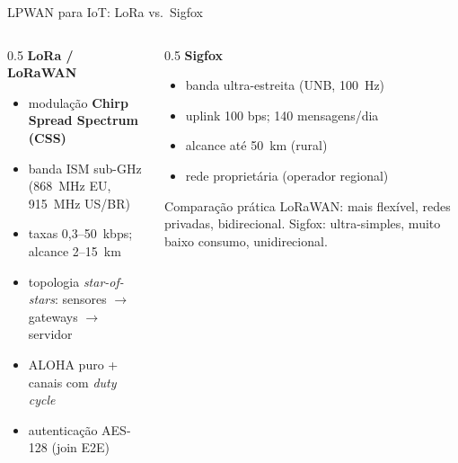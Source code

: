 \documentclass[aspectratio=169,11pt]{beamer}
\begin{document}
\begin{frame}{LPWAN para IoT: LoRa vs.\ Sigfox}
  \begin{columns}
    \begin{column}{0.5\textwidth}
      \textbf{LoRa / LoRaWAN}
      \begin{itemize}
        \item modulação \textbf{Chirp Spread Spectrum (CSS)}
        \item banda ISM sub-GHz (868~MHz EU, 915~MHz US/BR)
        \item taxas 0,3--50~kbps; alcance 2--15~km
        \item topologia \emph{star-of-stars}: sensores $\rightarrow$ gateways $\rightarrow$ servidor
        \item ALOHA puro + canais com \emph{duty cycle}
        \item autenticação AES-128 (join E2E)
      \end{itemize}
    \end{column}
    \begin{column}{0.5\textwidth}
      \textbf{Sigfox}
      \begin{itemize}
        \item banda ultra-estreita (UNB, 100~Hz)
        \item uplink 100 bps; 140 mensagens/dia
        \item alcance até 50~km (rural)
        \item rede proprietária (operador regional)
      \end{itemize}
      \pause
      \begin{block}{Comparação prática}
        LoRaWAN: mais flexível, redes privadas, bidirecional.
        Sigfox: ultra-simples, muito baixo consumo, unidirecional.
      \end{block}
    \end{column}
  \end{columns}
\end{frame}
\end{document}
